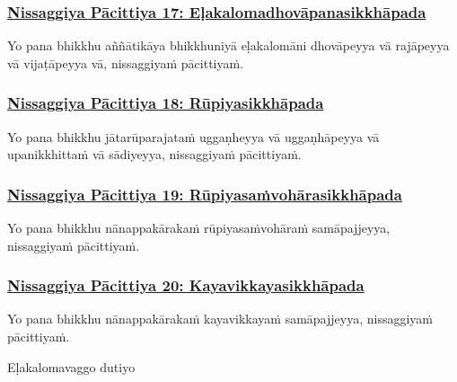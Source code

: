\subsubsection*{\hyperref[forf-exp17]{Nissaggiya Pācittiya 17: Eḷakalomadhovāpanasikkhāpada}}
\label{np17}

Yo pana bhikkhu aññātikāya bhikkhuniyā eḷakalomāni dhovāpeyya vā rajāpeyya vā vijaṭāpeyya vā, nissaggiyaṁ pācittiyaṁ.



\subsubsection*{\hyperref[forf-exp18]{Nissaggiya Pācittiya 18: Rūpiyasikkhāpada}}
\label{np18}

Yo pana bhikkhu jātarūparajataṁ uggaṇheyya vā uggaṇhāpeyya vā upanikkhittaṁ vā sādiyeyya, nissaggiyaṁ pācittiyaṁ.



\subsubsection*{\hyperref[forf-exp19]{Nissaggiya Pācittiya 19: Rūpiyasaṁvohārasikkhāpada}}
\label{np19}

Yo pana bhikkhu nānappakārakaṁ rūpiyasaṁvohāraṁ samāpajjeyya, nissaggiyaṁ pācittiyaṁ.



\subsubsection*{\hyperref[forf-exp20]{Nissaggiya Pācittiya 20: Kayavikkayasikkhāpada}}
\label{np20}

Yo pana bhikkhu nānappakārakaṁ kayavikkayaṁ samāpajjeyya, nissaggiyaṁ pācittiyaṁ.

\begin{center}
	Eḷakalomavaggo dutiyo\makeatletter\hyperlink{endnote197-appendix}\makeatother{}
\end{center}



